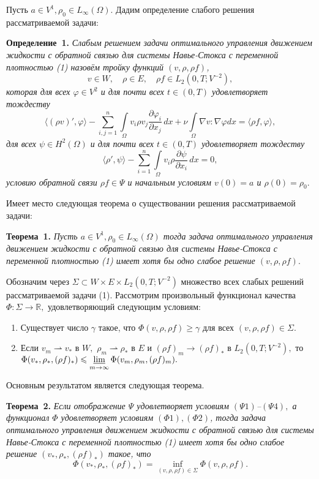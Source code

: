Пусть $a\in V^1, \rho_0\in L_\infty(\Omega).$ Дадим определение слабого решения рассматриваемой задачи:

\textbf{Определение~1.} {\it Слабым решением задачи оптимального уп\-равления движением жидкости с обратной связью для системы Навье-Стокса с переменной плотностью (1) назовём тройку функций $({v},\rho,\rho f)$,
$$
{v}\in W,\quad \rho \in E, \quad \rho f\in L_2(0,T;V^{-2}),
$$
которая для всех $\varphi\in V^2$ и для почти всех $t\in(0,T)$ удовлетворяет тождеству
$$
\langle(\rho v)',\varphi\rangle-\sum_{i,j=1}^n\int\limits_{\Omega}{v}_i \rho {v}_j\frac{\partial \varphi_i}{\partial x_j}\,dx+\nu \int\limits_{\Omega} \nabla v: \nabla \varphi dx=\langle \rho f,\varphi\rangle,
$$
для всех $\psi\in H^2(\Omega)$ и для почти всех $t\in(0,T)$ удовлетворяет тождеству
$$
\langle\rho',\psi\rangle -\sum_{i=1}^n\int\limits_{\Omega}{v}_i \rho \frac{\partial \psi}{\partial x_i}\,dx=0,
$$
условию обратной связи $\rho f \in \Psi$ и начальным условиям ${v}(0)=a$ и $\rho(0)=\rho_0.$}

Имеет место следующая теорема о существовании решения рассматриваемой задачи:

\textbf{Теорема~1.} {\it Пусть $a\in V^1, \rho_0\in L_\infty(\Omega)$ тогда задача оптимального уп\-равления движением жидкости с обратной связью для системы Навье-Стокса с переменной плотностью (1) имеет хотя бы одно слабое решение $({v},\rho, \rho f).$}

\renewcommand{\theenumi}{\arabic{enumi}}
\renewcommand{\labelenumi}{($\Phi$\theenumi)}
\par Обозначим через $\Sigma \subset W\times E\times {L}_2(0,T;V^{-2})$ множество всех слабых решений рассматриваемой задачи (1). Рассмотрим
произвольный функционал качества $\Phi: \Sigma \to \mathbb{R},$
удовлетворяющий следующим условиям:
\begin{enumerate}
\item Существует число $\gamma$ такое, что $\Phi (v,\rho, \rho f) \geqslant \gamma$ для всех $(v,\rho, \rho f)\in \Sigma.$
\item Если $v_m \rightharpoonup v_*$ в $W,$ $\rho_m \rightharpoonup \rho_*$ в $E$ и $(\rho f)_m \to (\rho f)_*$ в
${L}_2(0,T;V^{-2}),$ то $\Phi (v_*,\rho_*,(\rho f)_*) \leqslant
\varliminf\limits_{m\to \infty} \Phi (v_m,\rho_m,(\rho f)_m).$
\end{enumerate}
Основным результатом является следующая теорема.

\textbf{Теорема~2.} {\it Если отображение $\Psi$ удовлетворяет условиям
$(\Psi 1)$--$(\Psi 4),$ а функционал $\Phi$ удовлетворяет условиям $(\Phi 1),(\Phi 2)$, тогда задача оптимального уп\-равления движением жидкости с обратной связью для системы Навье-Стокса с переменной плотностью (1) имеет хотя бы одно слабое решение $(v_*,\rho_*,(\rho f)_*)$ такое, что
$$
\Phi (v_*,\rho_*,(\rho f)_*) = \inf\limits_{(v,\rho, \rho f)\in \Sigma}
\Phi (v,\rho,\rho f).$$}
